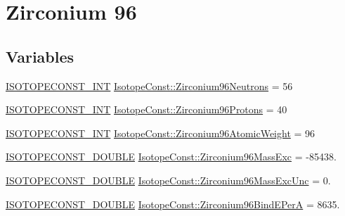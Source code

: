\hypertarget{group___isotope_const-_zirconium-_zr96}{}\section{Zirconium 96}
\label{group___isotope_const-_zirconium-_zr96}
\subsection*{Variables}
\begin{DoxyCompactItemize}
\item 
\mbox{\hyperlink{group___isotope_const-_macros_ga5f18360b3e99483a35c32d789e62621c}{I\+S\+O\+T\+O\+P\+E\+C\+O\+N\+S\+T\+\_\+\+I\+NT}} \mbox{\hyperlink{group___isotope_const-_zirconium-_zr96_ga84c1c95aedf5fccb554382f7164e16b6}{Isotope\+Const\+::\+Zirconium96\+Neutrons}} = 56
\item 
\mbox{\hyperlink{group___isotope_const-_macros_ga5f18360b3e99483a35c32d789e62621c}{I\+S\+O\+T\+O\+P\+E\+C\+O\+N\+S\+T\+\_\+\+I\+NT}} \mbox{\hyperlink{group___isotope_const-_zirconium-_zr96_gaf07b7317c8cd90ad25cad6188e53a3b1}{Isotope\+Const\+::\+Zirconium96\+Protons}} = 40
\item 
\mbox{\hyperlink{group___isotope_const-_macros_ga5f18360b3e99483a35c32d789e62621c}{I\+S\+O\+T\+O\+P\+E\+C\+O\+N\+S\+T\+\_\+\+I\+NT}} \mbox{\hyperlink{group___isotope_const-_zirconium-_zr96_ga41b183efcd1bb1484a9178d448530306}{Isotope\+Const\+::\+Zirconium96\+Atomic\+Weight}} = 96
\item 
\mbox{\hyperlink{group___isotope_const-_macros_ga8f45a7272ce02c0b4c65c44636ed719a}{I\+S\+O\+T\+O\+P\+E\+C\+O\+N\+S\+T\+\_\+\+D\+O\+U\+B\+LE}} \mbox{\hyperlink{group___isotope_const-_zirconium-_zr96_gaeda1fe6901f94737fd801858b0702889}{Isotope\+Const\+::\+Zirconium96\+Mass\+Exc}} = -\/85438.
\item 
\mbox{\hyperlink{group___isotope_const-_macros_ga8f45a7272ce02c0b4c65c44636ed719a}{I\+S\+O\+T\+O\+P\+E\+C\+O\+N\+S\+T\+\_\+\+D\+O\+U\+B\+LE}} \mbox{\hyperlink{group___isotope_const-_zirconium-_zr96_gafcbe89c7aab5ccb4ee3b8863868841be}{Isotope\+Const\+::\+Zirconium96\+Mass\+Exc\+Unc}} = 0.
\item 
\mbox{\hyperlink{group___isotope_const-_macros_ga8f45a7272ce02c0b4c65c44636ed719a}{I\+S\+O\+T\+O\+P\+E\+C\+O\+N\+S\+T\+\_\+\+D\+O\+U\+B\+LE}} \mbox{\hyperlink{group___isotope_const-_zirconium-_zr96_gabdc2ea4d7e15fb37cf409a8acad08e60}{Isotope\+Const\+::\+Zirconium96\+Bind\+E\+PerA}} = 8635.
\item 

\end{DoxyCompactItemize}
